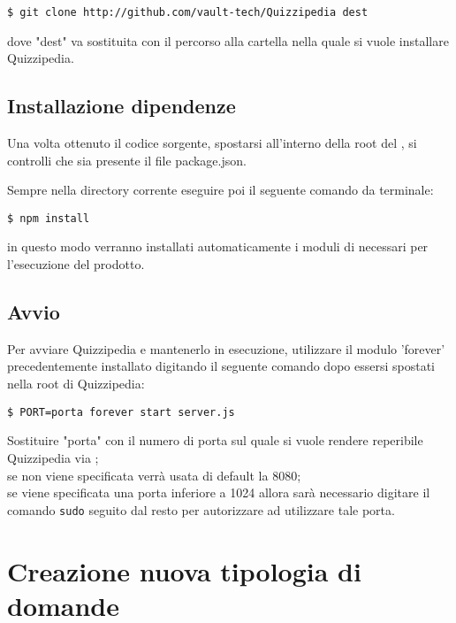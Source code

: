 \documentclass[a4paper, titlepage]{article}
\begin{document}
	\texttt{\$ git clone http://github.com/vault-tech/Quizzipedia dest}

	dove "dest" va sostituita con il percorso alla cartella nella quale si vuole installare Quizzipedia.

	\subsection{Installazione dipendenze}
	
	Una volta ottenuto il codice sorgente, spostarsi all'interno della root del , si controlli che sia presente il file package.json.
	
	Sempre nella directory corrente eseguire poi il seguente comando da terminale:
	
	\texttt{\$ npm install}
	
	in questo modo verranno installati automaticamente i moduli di  necessari per l'esecuzione del prodotto.
	
	\subsection{Avvio}
	
	Per avviare Quizzipedia e mantenerlo in esecuzione, utilizzare il modulo  'forever' precedentemente installato digitando il seguente comando dopo essersi spostati nella root di Quizzipedia:

	\texttt{\$ PORT=porta forever start server.js}

	Sostituire "porta" con il numero di porta sul quale si vuole rendere reperibile Quizzipedia via ;\\
	se non viene specificata verrà usata di default la 8080;\\
	se viene specificata una porta inferiore a 1024 allora sarà necessario digitare il comando \texttt{sudo} seguito dal resto per autorizzare  ad utilizzare tale porta.
	
	\newpage
	
	\section{Creazione nuova tipologia di domande}
	
\end{document}
